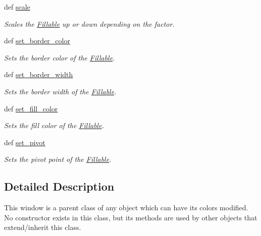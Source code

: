 \begin{DoxyCompactItemize}
def \hyperlink{classcs110graphics_1_1Fillable_a80d5b6b6d2ebae867dccecb803075749}{scale}
\begin{DoxyCompactList}\small\item\em Scales the \hyperlink{classcs110graphics_1_1Fillable}{Fillable} up or down depending on the factor. \item\end{DoxyCompactList}\item 
def \hyperlink{classcs110graphics_1_1Fillable_a2f830be5d970faac97759910d20d68a4}{set\_\-border\_\-color}
\begin{DoxyCompactList}\small\item\em Sets the border color of the \hyperlink{classcs110graphics_1_1Fillable}{Fillable}. \item\end{DoxyCompactList}\item 
def \hyperlink{classcs110graphics_1_1Fillable_a09f05462cb2ed38fdccb244340f05b2b}{set\_\-border\_\-width}
\begin{DoxyCompactList}\small\item\em Sets the border width of the \hyperlink{classcs110graphics_1_1Fillable}{Fillable}. \item\end{DoxyCompactList}\item 
def \hyperlink{classcs110graphics_1_1Fillable_a4f24c7186c8d057e42a0209eb1d56be7}{set\_\-fill\_\-color}
\begin{DoxyCompactList}\small\item\em Sets the fill color of the \hyperlink{classcs110graphics_1_1Fillable}{Fillable}. \item\end{DoxyCompactList}\item 
def \hyperlink{classcs110graphics_1_1Fillable_a2a6066d1a11c0854ff5ee85e7d9ceb54}{set\_\-pivot}
\begin{DoxyCompactList}\small\item\em Sets the pivot point of the \hyperlink{classcs110graphics_1_1Fillable}{Fillable}. \item\end{DoxyCompactList}\end{DoxyCompactItemize}


\subsection{Detailed Description}
This window is a parent class of any object which can have its colors modified. No constructor exists in this class, but its methods are used by other objects that extend/inherit this class. 


